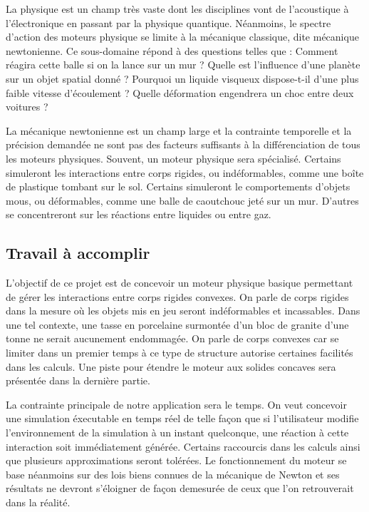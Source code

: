 La physique est un champ très vaste dont les disciplines vont de l'acoustique à l'électronique en passant par la physique quantique. Néanmoins, le spectre d'action des moteurs physique se limite à la mécanique classique, dite mécanique newtonienne. Ce sous-domaine répond à des questions telles que : Comment réagira cette balle si on la lance sur un mur ? Quelle est l'influence d'une planète sur un objet spatial donné ? Pourquoi un liquide visqueux dispose-t-il d'une plus faible vitesse d'écoulement ? Quelle déformation engendrera un choc entre deux voitures ?

La mécanique newtonienne est un champ large et la contrainte temporelle et la précision demandée ne sont pas des facteurs suffisants à la différenciation de tous les moteurs physiques. Souvent, un moteur physique sera spécialisé. Certains simuleront les interactions entre corps rigides, ou indéformables, comme une boîte de plastique tombant sur le sol. Certains simuleront le comportements d'objets mous, ou déformables, comme une balle de caoutchouc jeté sur un mur. D'autres se concentreront sur les réactions entre liquides ou entre gaz.

\subsection{Travail à accomplir}

L'objectif de ce projet est de concevoir un moteur physique basique permettant de gérer les interactions entre corps rigides convexes. On parle de corps rigides dans la mesure o\`u les objets mis en jeu seront indéformables et incassables. Dans une tel contexte, une tasse en porcelaine surmontée d'un bloc de granite d'une tonne ne serait aucunement endommagée. On parle de corps convexes car se limiter dans un premier temps à ce type de structure autorise certaines facilités dans les calculs. Une piste pour étendre le moteur aux solides concaves sera présentée dans la dernière partie.

La contrainte principale de notre application sera le temps. On veut concevoir une simulation éxecutable en temps réel de telle façon que si l'utilisateur modifie l'environnement de la simulation à un instant quelconque, une réaction à cette interaction soit immédiatement générée. Certains raccourcis dans les calculs ainsi que plusieurs approximations seront tolérées. Le fonctionnement du moteur se base néanmoins sur des lois biens connues de la mécanique de Newton et ses résultats ne devront s'éloigner de façon demesurée de ceux que l'on retrouverait dans la réalité.

